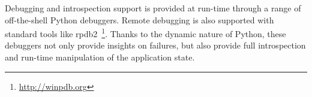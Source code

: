 \documentclass[a4paper, 10pt, conference]{ieeeconf}      %
\newcommand{\pyRobots}{\textsc{pyRobots}}
\begin{document}
Debugging and introspection support is provided at run-time through a range of
off-the-shell Python debuggers. Remote debugging is also supported with standard
tools like {\sc rpdb2}~\footnote{\url{http://winpdb.org}}. Thanks to the dynamic
nature of Python, these debuggers not only provide insights on failures, but
also provide full introspection and run-time manipulation of the application
state.

% 
% 
% 
% 
% 
% 
% 
% 
% 
% 
% 
% 
% 
% 
% 
% 
% 
% 
% 
% 
% 
% 
\end{document}
